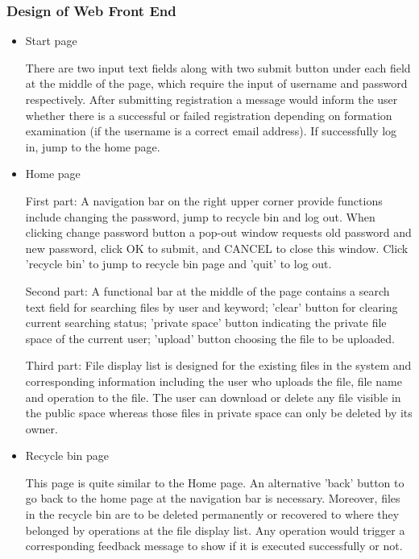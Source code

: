 \documentclass[a4paper,11pt]{article}
\begin{document}
\subsubsection{Design of Web Front End}
\begin{itemize}

\item \par Start page
\par There are two input text fields along with two submit button under each field at the middle of the page, which require the input of username and password respectively. After submitting registration a message would inform the user whether there is a successful or failed registration depending on formation examination (if the username is a correct email address). 
If successfully log in, jump to the home page.

\item \par Home page 
\par First part: A navigation bar on the right upper corner provide functions include changing the password, jump to recycle bin and log out. When clicking change password button a pop-out window requests old password and new password, click OK to submit, and CANCEL to close this window. Click 'recycle bin' to jump to recycle bin page and 'quit' to log out.
\par Second part: A functional bar at the middle of the page contains a search text field for searching files by user and keyword; 'clear' button for clearing current searching status; 'private space' button indicating the private file space of the current user; 'upload' button choosing the file to be uploaded.
\par Third part: File display list is designed for the existing files in the system and corresponding information including the user who uploads the file, file name and operation to the file. The user can download or delete any file visible in the public space whereas those files in private space can only be deleted by its owner.

\item \par Recycle bin page
\par This page is quite similar to the Home page. An alternative 'back' button to go back to the home page at the navigation bar is necessary. Moreover, files in the recycle bin are to be deleted permanently or recovered to where they belonged by operations at the file display list. Any operation would trigger a corresponding feedback message to show if it is executed successfully or not.
\end{itemize}
\end{document}
